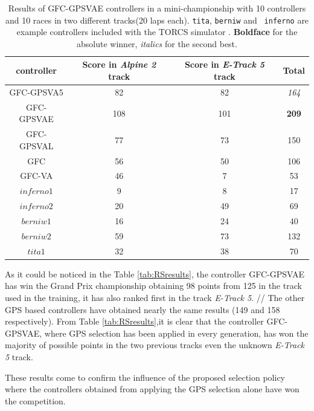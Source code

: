 \documentclass[10pt,journal,compsoc]{IEEEtran}
\begin{document}
%
\begin{table}[ht]
	\centering
	{\scriptsize
		\caption{ Results of {\sf GFC-GPSVAE} controllers in a mini-championship with 10 controllers and 10
			races in two different tracks(20 laps each). {\tt tita}, {\tt berniw} and {\tt
				inferno} are example controllers included with the TORCS
			simulator \cite{torcs4}. {\bf Boldface}
                      for the absolute winner, {\em italics} for the second
                    best.}
		{
			\begin{tabular}{|c|c|c||c|}
				\hline
				controller&Score in \textit{Alpine 2} track &Score in \textit{E-Track 5} track &Total\\
				\hline
				\hline	
				{\sf GFC-GPSVA5} \cite{DBLP:conf/cig/SalemMG19}&	82&	82&	{\em 164}\\
				{\sf GFC-GPSVAE} &	108&    101&	{\bf 209}\\
				{\sf GFC-GPSVAL} \cite{DBLP:conf/cig/SalemMG19}&	77&	73&	150\\
				{\sf GFC}  \cite{salem_cig2018}&	56&	50&	106\\
				{\sf GFC-VA} \cite{DBLP:conf/cig/SalemMG19}&	46&	7&	53\\
				$inferno1$&	9&	8&	17\\
				$inferno2$&	20&	49&	69\\
				$berniw1$&	16&	24&	40\\
				$berniw2$&	59&	73&	132\\
				$tita1$&	32&	38&	70\\			
				\hline
				
			\end{tabular}
		}\label{tab:VaryingalphaRSresults}
	}
\end{table}
%
As it could be noticed in the Table \ref{tab:RSresults}, the controller {\sf GFC-GPSVAE} has win the Grand Prix championship obtaining 98 points from 125 in the track used in the training, it has also ranked first in the track  \textit{E-Track 5}. //
The other GPS based controllers have obtained nearly the same results (149 and 158 respectively).
From Table \ref{tab:RSresults},it is clear that the controller {\sf GFC-GPSVAE}, where GPS selection has been applied in every generation, has won the majority of possible points in the two previous tracks even the unknown \textit{E-Track 5}  track.

These results come to confirm the influence of the proposed selection policy where the controllers obtained from applying the GPS selection alone have won the competition.
 
\end{document}
